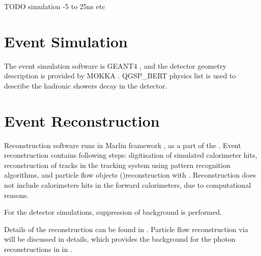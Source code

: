 TODO
\ggHad simulation -5 to 25ns etc


\section{Event Simulation}

The event simulation software is GEANT4 \cite{Agostinelli:2002hh}, and the detector geometry description is provided by MOKKA \cite{MoradeFreitas:2002kj}.  QGSP\_BERT physics list is used to describe the hadronic showers decay in the detector.




\section{Event Reconstruction}

Reconstruction software runs in Marlin framework \cite{Gaede:2006pj}, as a part of the \ilcsoft. Event reconstruction contains following steps: digitisation of simulated calorimeter hits, reconstruction of tracks in the tracking system using pattern recognition algorithms, and particle flow objects (\PFOs)reconstruction with \pandora\cite{Thomson:2009rp,Marshall:2012ry}. Reconstruction does not include calorimeters hits in the forward calorimeters, due to computational reasons.

For the \CLIC detector simulations, suppression of \ggHad background is performed.

Details of the reconstruction can be found in \cite{Brau:2007zza,Linssen:2012hp}. Particle flow reconstruction via \pandora will be discussed in details, which provides the background for the photon reconstructions in \pandora in .


